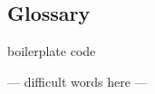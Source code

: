\documentclass[10pt,a4paper]{article}
\begin{document}
\pagestyle{empty} 


\newpage

\setcounter{page}{1}
\pagestyle{plain}


\begin{multicols}{2}
\tableofcontents
\end{multicols}
\pagebreak

\begin{multicols}{2}












\setcounter{section}{0}
\renewcommand\thesection{\Alph{section}}
\section{Glossary}
boilerplate code

--- difficult words here ---

\end{multicols}

\printbibliography
\end{document}
